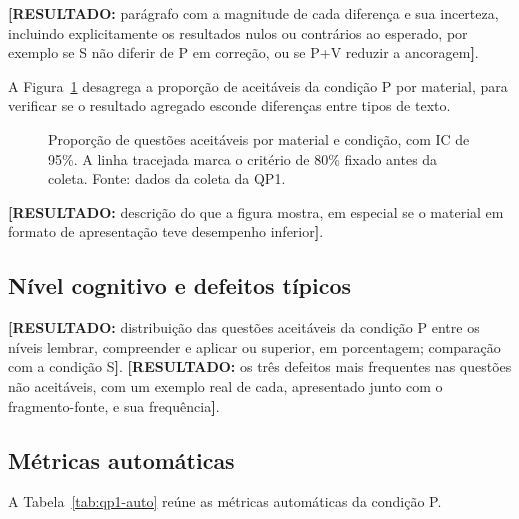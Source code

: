 \documentclass[portuguese,oneside]{tcc}
\newcommand{\resultado}[1]{\textcolor{red!70!black}{\textbf{[RESULTADO:} #1\textbf{]}}}
\begin{document}
\resultado{parágrafo com a magnitude de cada diferença e sua incerteza, incluindo explicitamente os resultados nulos ou contrários ao esperado, por exemplo se S não diferir de P em correção, ou se P+V reduzir a ancoragem}.

A Figura~\ref{fig:qp1-material} desagrega a proporção de aceitáveis da condição P por material, para verificar se o resultado agregado esconde diferenças entre tipos de texto.

\begin{figure}[htbp]
\centering
{}
\caption{Proporção de questões aceitáveis por material e condição, com IC de 95\%. A linha tracejada marca o critério de 80\% fixado antes da coleta. Fonte: dados da coleta da QP1.}
\label{fig:qp1-material}
\end{figure}

\resultado{descrição do que a figura mostra, em especial se o material em formato de apresentação teve desempenho inferior}.

\subsection{Nível cognitivo e defeitos típicos}

\resultado{distribuição das questões aceitáveis da condição P entre os níveis lembrar, compreender e aplicar ou superior, em porcentagem; comparação com a condição S}. \resultado{os três defeitos mais frequentes nas questões não aceitáveis, com um exemplo real de cada, apresentado junto com o fragmento-fonte, e sua frequência}.

\subsection{Métricas automáticas}

A Tabela~\ref{tab:qp1-auto} reúne as métricas automáticas da condição P.
\end{document}
